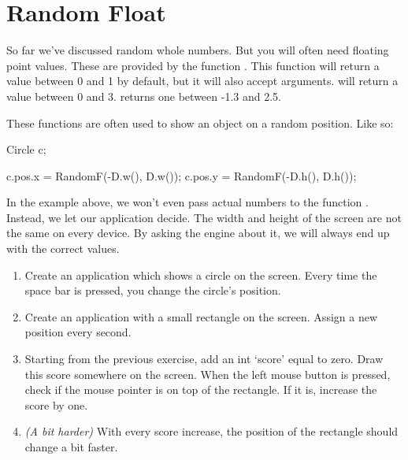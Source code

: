 \section{Random Float}
So far we've discussed random whole numbers. But you will often need floating point values. These are provided by the function . This function will return a value between 0 and 1 by default, but it will also accept arguments.  will return a value between 0 and 3.  returns one between -1.3 and 2.5.

These functions are often used to show an object on a random position. Like so:

\begin{code}
Circle c;

c.pos.x = RandomF(-D.w(), D.w());
c.pos.y = RandomF(-D.h(), D.h());
\end{code}

In the example above, we won't even pass actual numbers to the function . Instead, we let our application decide. The width and height of the screen are not the same on every device. By asking the engine about it, we will always end up with the correct values.

\begin{exercise}
\begin{enumerate}
\item Create an application which shows a circle on the screen. Every time the space bar is pressed, you change the circle's position.
\item Create an application with a small rectangle on the screen. Assign a new position every second. 
\item Starting from the previous exercise, add an int `score' equal to zero. Draw this score somewhere on the screen. When the left mouse button is pressed, check if the mouse pointer is on top of the rectangle. If it is, increase the score by one.
\item \textit{(A bit harder)} With every score increase, the position of the rectangle should change a bit faster.
\end{enumerate}  
\end{exercise}



